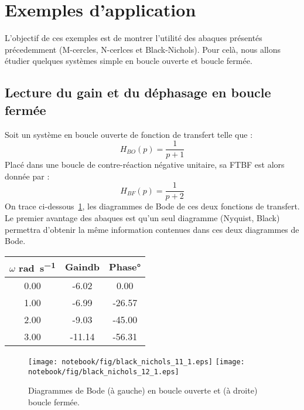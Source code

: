 \section{Exemples d'application}\label{exemples-dapplication}
L'objectif de ces exemples est de montrer l'utilité des abaques présentés 
précedemment (M-cercles, N-cerlces et Black-Nichols). Pour celà, nous allons 
étudier quelques systèmes simple en boucle ouverte et boucle fermée.
\subsection{Lecture du gain et du déphasage en boucle fermée}
Soit un système en boucle ouverte de fonction de transfert telle que :
\[
    H_{BO}(p)=\dfrac{1}{p+1}
\]
Placé dans une boucle de contre-réaction négative unitaire, sa FTBF est alors
donnée par :
\[
    H_{BF}(p)=\dfrac{1}{p+2}
\]
On trace ci-dessous~\cref{fig-exemple1_bodeBlackNichols}, les diagrammes de 
Bode de ces deux fonctions de transfert. Le premier avantage des abaques est 
qu'un seul diagramme (Nyquist, Black) 
permettra d'obtenir la même information contenues dans ces deux 
diagrammes de Bode.
\begin{center}
\begin{tabular}{ccc}
\hline
$\omega$ \si{\radian\per\second} & Gain\si{\decibel} & Phase\si{\degree}\\
\hline
0.00 & -6.02 & 0.00\\
1.00 & -6.99 & -26.57\\
2.00 & -9.03 & -45.00\\
3.00 & -11.14 & -56.31\\
\hline
\end{tabular}
\end{center}
\begin{figure}[!h]
\begin{center}
    \texttt{[image: notebook/fig/black\_nichols\_11\_1.eps]}
    \texttt{[image: notebook/fig/black\_nichols\_12\_1.eps]}
\end{center}
    \caption{Diagrammes de Bode (à gauche) en boucle ouverte et (à droite) 
    boucle fermée.\label{fig-exemple1_bodeBlackNichols}}
\end{figure}

